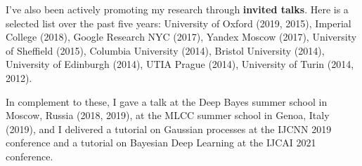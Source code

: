 \documentclass[a4paper,10pt]{article}
\begin{document}
I've also been actively promoting my research through {\bf invited talks}. 
Here is a selected list over the past five years:
University of Oxford (2019, 2015), Imperial College (2018), Google Research NYC (2017), Yandex Moscow (2017), University of Sheffield (2015), Columbia University (2014), Bristol University (2014), University of Edinburgh (2014), UTIA Prague (2014), University of Turin (2014, 2012).

In complement to these, I gave a talk at the Deep Bayes summer school in Moscow, Russia (2018, 2019), at the MLCC summer school in Genoa, Italy (2019),
and I delivered a tutorial on Gaussian processes at the IJCNN 2019 conference and a tutorial on Bayesian Deep Learning at the IJCAI 2021 conference. 




\end{document}
